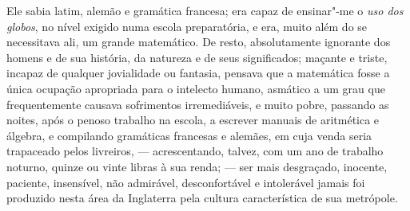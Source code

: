 Ele sabia latim, alemão e gramática francesa; era capaz de ensinar"-me o
\textit{uso dos globos}, no nível exigido numa escola preparatória, e era,
muito além do se necessitava ali, um grande matemático. De resto,
absolutamente ignorante dos homens e de sua história, da natureza e de
seus significados; maçante e triste, incapaz de qualquer jovialidade ou
fantasia, pensava que a matemática fosse a única ocupação apropriada
para o intelecto humano, asmático a um grau que frequentemente causava
sofrimentos irremediáveis, e muito pobre, passando as noites, após o
penoso trabalho na escola, a escrever manuais de aritmética e álgebra, e
compilando gramáticas francesas e alemães, em cuja venda seria
trapaceado pelos livreiros, --- acrescentando, talvez, com um ano de
trabalho noturno, quinze ou vinte libras à sua renda; --- ser mais
desgraçado, inocente, paciente, insensível, não admirável,
desconfortável e intolerável jamais foi produzido nesta área da
Inglaterra pela cultura característica de sua metrópole.

